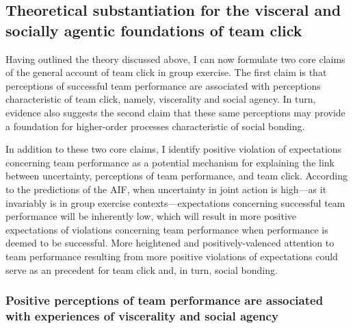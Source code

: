 \begin{CJK}{UTF8}{gbsn}
\subsection{Theoretical substantiation for the visceral and socially agentic foundations of team click}

Having outlined the theory discussed above, I can now formulate two core claims of the general account of team click in group exercise.  The first claim is that perceptions of successful team performance are associated with perceptions characteristic of team click, namely, viscerality and social agency.  In turn, evidence also suggests the second claim that these same perceptions may provide a foundation for higher-order processes characteristic of social bonding.

In addition to these two core claims, I identify positive violation of expectations concerning team performance as a potential mechanism for explaining the link between uncertainty, perceptions of team performance, and team click.  According to the predictions of the AIF, when uncertainty in joint action is high---as it invariably is in group exercise contexts---expectations concerning successful team performance will be inherently low, which will result in more positive expectations of violations concerning team performance when performance is deemed to be successful.  More heightened and positively-valenced attention to team performance resulting from more positive violations of expectations could serve as an precedent for team click and, in turn, social bonding.




\subsubsection{Positive perceptions of team performance are associated with experiences of viscerality and social agency}



\end{CJK}
